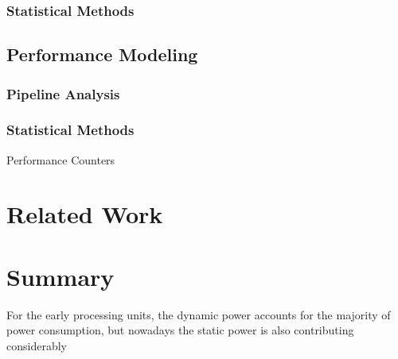 \subsubsection{Statistical Methods}

\subsection{Performance Modeling}
\label{section:powermodels}
\subsubsection{Pipeline Analysis}
\subsubsection{Statistical Methods}
Performance Counters

\section{Related Work}

\section{Summary}


For the early processing units, the dynamic power accounts for the majority of power consumption, but nowadays the static power is also contributing considerably